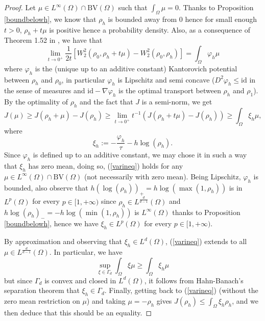 \documentclass[12pt, a4paper]{article}
\numberwithin{equation}{section}
\theoremstyle{plain}
\theoremstyle{definition}
\theoremstyle{remark}
\newcommand{\BV}{\mathrm{BV}}
\newcommand{\id}{\mathrm{id}}
\newcommand\pref[1]{(\ref{#1})}
\begin{document}
\begin{proof} 
 Let $\mu \in L^{\infty}(\Omega)\cap \BV(\Omega)$ such that $\int_{\Omega} \mu=0$. Thanks to Proposition \ref{boundbelowh}, we know that $\rho_h$ is bounded away from $0$ hence for small enough $t>0$, $\rho_h + t \mu$ is positive hence a probability density. Also, as a consequence of Theorem 1.52 in \cite{santambrogio2015optimal}, we have that 
\begin{equation}\label{derivW}
\lim_{t\to 0^+} \frac{1}{2t}[W_2^2(\rho_0, \rho_h+t \mu)-W_2^2(\rho_0, \rho_h)]=\int_{\Omega} \varphi_h   \mu
\end{equation}
where $\varphi_h$ is the (unique up to an additive constant) Kantorovich potential between $\rho_h$ and $\rho_0$, in particular $\varphi_h$  is Lipschitz and semi concave ($D^2 \varphi_h \le \id$ in the sense of measures and $\id-\nabla \varphi_h$ is the optimal transport between $\rho_h$ and $\rho_1$). By the optimality of $\rho_h$ and the fact that $J$ is a semi-norm, we get
\begin{equation}\label{varineq}
J(\mu) \ge J(\rho_h+\mu)-J(\rho_h)\ge \lim_{t\to 0^+} t^{-1} (J(\rho_h+t \mu)-J(\rho_h))    \ge \int_{\Omega} \xi_h \mu,
\end{equation}
 where 
 \[ \xi_h:=-\frac{\varphi_h}{\tau} -h \log(\rho_h).\]
Since $\varphi_h$ is defined up to an additive constant, we may chose it in such a way that $\xi_h$ has zero mean, doing so, \pref{varineq} holds for any $\mu \in L^{\infty}(\Omega)\cap \BV(\Omega)$ (not necessarily with zero mean). Being Lipschitz, $\varphi_h$ is bounded,  also observe that $h(\log(\rho_h))_+=h\log(\max(1, \rho_h))$ is in $L^p(\Omega)$ for every $p\in [1,+\infty)$ since $\rho_h\in L^{\frac{d}{d-1}}(\Omega)$ and $h \log(\rho_h)_-=-h\log(\min(1, \rho_h))$ is $L^{\infty}(\Omega)$ thanks to Proposition \ref{boundbelowh}, hence we have $\xi_h \in L^{p}(\Omega)$ for every $p\in [1,+\infty)$.  



 By approximation and observing that $\xi_h \in L^{d}(\Omega)$, \pref{varineq} extends to all $\mu\in L^{\frac{d}{d-1}}(\Omega)$. In particular, we have
\[\sup_{\xi \in \Gamma_d} \int_{\Omega} \xi \mu \ge \int_{\Omega} \xi_h \mu\]
but since $\Gamma_d$ is convex and closed in $L^d(\Omega)$, it follows from Hahn-Banach's separation theorem that $\xi_h \in \Gamma_d$. Finally, getting back to \pref{varineq} (without the zero mean restriction on $\mu$) and taking $\mu=-\rho_h$ gives $J(\rho_h)\leq \int_{\Omega} \xi_h \rho_h$, and we then deduce  that this should be an equality.



\smallskip
 
\end{proof} 
 
\end{document}
